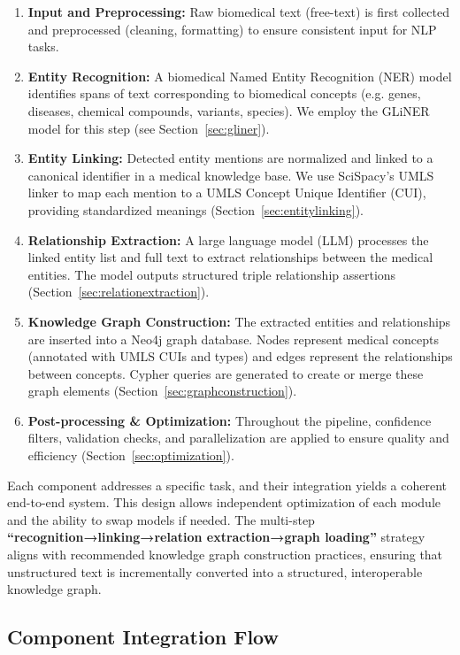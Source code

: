 \begin{enumerate}
\item \textbf{Input and Preprocessing:} Raw biomedical text (free-text) is first collected and preprocessed (cleaning, formatting) to ensure consistent input for NLP tasks.
\item \textbf{Entity Recognition:} A biomedical Named Entity Recognition (NER) model identifies spans of text corresponding to biomedical concepts (e.g. genes, diseases, chemical compounds, variants, species). We employ the GLiNER model for this step (see Section~\ref{sec:gliner}).
\item \textbf{Entity Linking:} Detected entity mentions are normalized and linked to a canonical identifier in a medical knowledge base. We use SciSpacy's UMLS linker to map each mention to a UMLS Concept Unique Identifier (CUI), providing standardized meanings (Section~\ref{sec:entitylinking}).
\item \textbf{Relationship Extraction:} A large language model (LLM) processes the linked entity list and full text to extract relationships between the medical entities. The model outputs structured triple relationship assertions (Section~\ref{sec:relationextraction}).
\item \textbf{Knowledge Graph Construction:} The extracted entities and relationships are inserted into a Neo4j graph database. Nodes represent medical concepts (annotated with UMLS CUIs and types) and edges represent the relationships between concepts. Cypher queries are generated to create or merge these graph elements (Section~\ref{sec:graphconstruction}).
\item \textbf{Post-processing \& Optimization:} Throughout the pipeline, confidence filters, validation checks, and parallelization are applied to ensure quality and efficiency (Section~\ref{sec:optimization}).
\end{enumerate}

Each component addresses a specific task, and their integration yields a coherent end-to-end system. This design allows independent optimization of each module and the ability to swap models if needed. The multi-step \textbf{``recognition→linking→relation extraction→graph loading''} strategy aligns with recommended knowledge graph construction practices, ensuring that unstructured text is incrementally converted into a structured, interoperable knowledge graph.

\subsection{Component Integration Flow}

